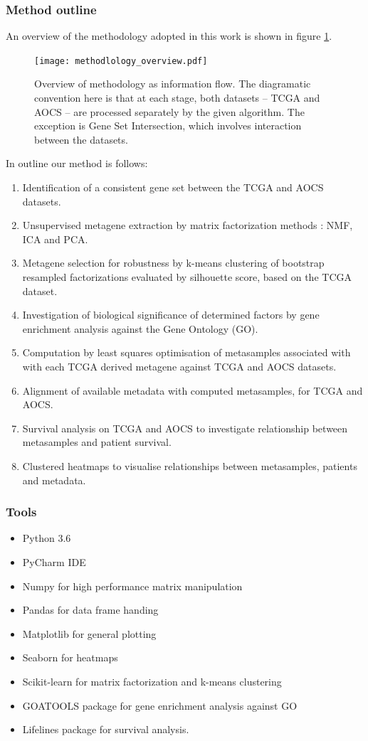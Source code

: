 \documentclass[draft, tikz, 12pt,a4paper,oneside,fleqn]{article}
\begin{document}
\subsubsection{Method outline}
An overview of the methodology adopted in this work is shown in figure \ref{fig-method-overview}.

\begin{figure}
\begin{center}
\texttt{[image: methodlology\_overview.pdf]}
\end{center}
\caption{Overview of methodology as information flow.  The diagramatic convention here is that at each stage, both datasets -- TCGA and AOCS -- are processed separately by the given algorithm.  The exception is Gene Set Intersection, which involves interaction between the datasets.}
\label{fig-method-overview}
\end{figure}
In outline our method is follows:
\begin{enumerate}
\item
Identification of a consistent gene set between the TCGA and AOCS datasets.
\item
Unsupervised metagene extraction by matrix factorization methods : NMF, ICA and PCA.
\item
Metagene selection for robustness by k-means clustering of bootstrap resampled factorizations evaluated by silhouette score, based on the TCGA dataset.
\item
Investigation of biological significance of determined factors by gene enrichment analysis against the Gene Ontology (GO).
\item
Computation by least squares optimisation of metasamples associated with with each TCGA derived metagene against TCGA and AOCS datasets.
\item
Alignment of available metadata with computed metasamples, for TCGA and AOCS.
\item 
Survival analysis on TCGA and AOCS to investigate relationship between metasamples and patient survival.
\item
Clustered heatmaps to visualise relationships between metasamples, patients and metadata.
\end{enumerate}

\subsubsection{Tools}
\begin{itemize}
\item Python 3.6
\item PyCharm IDE
\item Numpy for high performance matrix manipulation
\item Pandas for data frame handing
\item Matplotlib for general plotting
\item Seaborn for heatmaps
\item Scikit-learn for matrix factorization and k-means clustering
\item GOATOOLS package for gene enrichment analysis against GO
\item Lifelines package for survival analysis.
\end{itemize}
\end{document}
